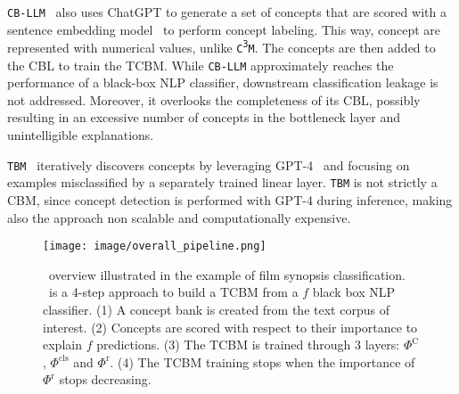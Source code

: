 \texttt{CB-LLM}~\cite{cbm_crafting, cb_llm} also uses ChatGPT to generate a set of concepts that are scored with a sentence embedding model~\cite{reimers_sentence-bert_2019} to perform concept labeling. This way, concept are represented with numerical values, unlike \texttt{C\textsuperscript{3}M}. The concepts are then added to the CBL to train the TCBM. While \texttt{CB-LLM} approximately reaches the performance of a black-box NLP classifier, downstream classification leakage is not addressed. Moreover, it overlooks the completeness of its CBL, possibly resulting in an excessive number of concepts in the bottleneck layer and unintelligible explanations.

\texttt{TBM}~\cite{cbm_by_design} iteratively discovers concepts by leveraging GPT-4~\cite{gpt4} and focusing on examples misclassified by a separately trained linear layer. \texttt{TBM} is not strictly a CBM, since concept detection is performed with GPT-4 during inference, making also the approach non scalable and computationally expensive.


\begin{figure*}[t]{\centering}
\begin{center}
\texttt{[image: image/overall\_pipeline.png]}
\caption{\method\ overview illustrated in the example of film synopsis classification. \method\ is a 4-step approach to build a TCBM from a $f$ black box NLP classifier. (1) A concept bank is created from the text corpus of interest. (2) Concepts are scored with respect to their importance to explain $f$ predictions. (3) The TCBM is trained through 3 layers: $\Phi^{\text{C}}$, $\Phi^{\text{cls}}$ and $\Phi^{\text{r}}$. (4) The TCBM training stops when the importance of $\Phi^{\text{r}}$ stops decreasing.}  
\label{fig:global_flow}
\end{center}
\end{figure*}